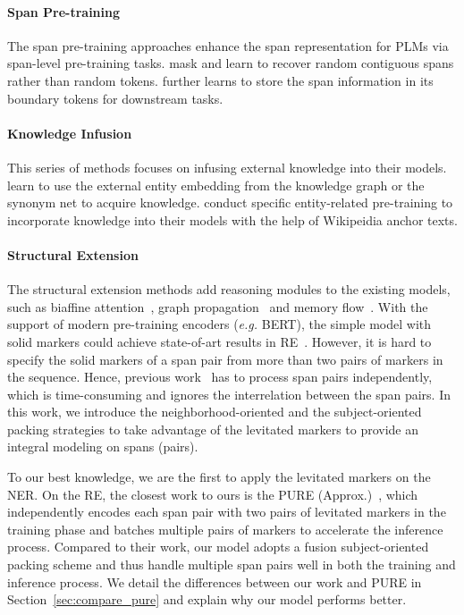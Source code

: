 \documentclass[11pt]{article}
\begin{document}
\paragraph{Span Pre-training} The span pre-training approaches enhance the span representation for PLMs via span-level pre-training tasks. \citet{ERNIE-baidu,BART, T5} mask and learn to recover  random contiguous spans rather than  random tokens. \citet{spanbert} further learns to store the span information in its boundary tokens for downstream tasks.


\paragraph{Knowledge Infusion} This series of methods focuses on infusing external knowledge into their models.  \citet{ERNIE-zhengyan, KnowBERT, K-adapter} learn to use the external entity embedding from the knowledge graph or the synonym net to acquire knowledge. \citet{MTB,  WKLM,KEPLER,LUKE} conduct specific entity-related pre-training to incorporate knowledge into their models with the help of Wikipeidia anchor texts.


\paragraph{Structural Extension} The structural extension methods add reasoning modules to the existing models, such as biaffine attention~\cite{UniRE}, graph propagation~\cite{DyGIEpp} and memory flow~\cite{TriMF}. With the support of modern pre-training encoders (\emph{e.g.} BERT), the simple model with solid markers could achieve state-of-art results in RE~\cite{Typemarker,PURE}.  
However, it is hard to specify the solid markers of a span pair from more than two pairs of markers in the sequence. 
Hence, previous work~\cite{PURE} has to process span pairs independently, which is time-consuming and ignores the interrelation between the span pairs. In this work, we introduce the neighborhood-oriented and the subject-oriented packing strategies to take advantage of the levitated markers to provide an integral modeling on spans (pairs).

To our best knowledge,  we are the first to apply the levitated markers on the NER. On the RE,  the closest work to ours is the PURE (Approx.)~\cite{PURE},  which  independently encodes each span pair with two pairs of levitated markers in the training phase  and batches multiple pairs of markers to accelerate the inference process. Compared to their work, our model adopts a fusion  subject-oriented packing scheme and thus handle multiple span pairs well in both the training and inference process. We detail the differences between our work and PURE in Section~\ref{sec:compare_pure} and explain why our model performs better.
\end{document}

